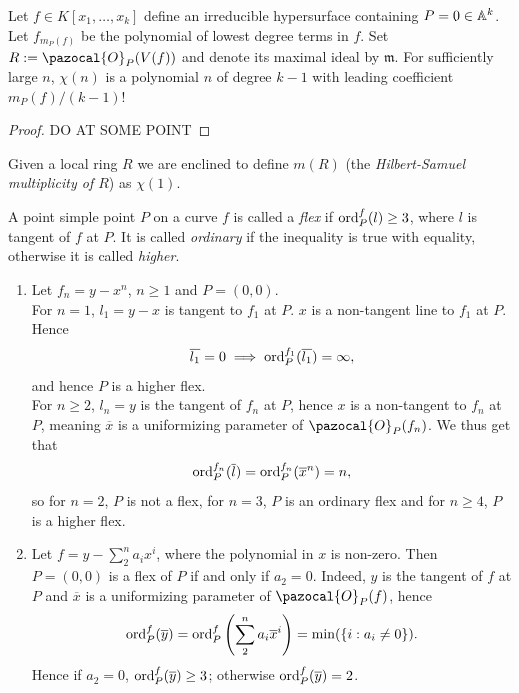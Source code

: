     \begin{proposition}
        Let $f\in K[x_1,\dots,x_k]$ define an irreducible hypersurface containing $P=0\in \mathbb{A}^k$. Let $f_{m_P(f)}$ be the polynomial of lowest degree terms in $f$. Set $R:= \pazocal{O}_P(V(f))$ and denote its maximal ideal by $\mathfrak{m}$. For sufficiently large $n$, $\chi(n)$ is a polynomial $n$ of degree $k-1$ with leading coefficient $m_P(f)/(k-1)!$ 
    \end{proposition}
    \begin{proof}
        {\LARGE DO AT SOME POINT}
    \end{proof}
    \begin{remark}
        Given a local ring $R$ we are enclined to define $m(R)$ (the \textit{Hilbert-Samuel multiplicity of $R$}) as $\chi(1)$.
    \end{remark}
    \begin{definition}
        A point simple point $P$ on a curve $f$ is called a \textit{flex} if $\mathrm{ord}_P^f(l) \geq 3$, where $l$ is tangent of $f$ at $P$. It is called \textit{ordinary} if the inequality is true with equality, otherwise it is called \textit{higher}. 
    \end{definition}
    \begin{example}
        \begin{enumerate}
            \item Let $f_n = y-x^n$, $n\geq1$ and $P=(0,0)$.\\ 
            For $n=1$, $l_1=y-x$ is tangent to $f_1$ at $P$. $x$ is a non-tangent line to $f_1$ at $P$. Hence
            $$\overline{l_1} = 0 \implies \mathrm{ord}_P^{f_1}(\overline{l_1}) = \infty,$$
            and hence $P$ is a higher flex. \\
            For $n\geq 2$, $l_n=y$ is the tangent of $f_n$ at $P$, hence $x$ is a non-tangent to $f_n$ at $P$, meaning $\overline{x}$ is a uniformizing parameter of $\pazocal{O}_P(f_n)$. We thus get that 
            $$\mathrm{ord}_P^{f_n}(\overline{l})=\mathrm{ord}_P^{f_n}(\overline{x}^n)=n,$$
            so for $n=2$, $P$ is not a flex, for $n=3$, $P$ is an ordinary flex and for $n\geq 4$, $P$ is a higher flex. 
            \item Let $f = y - \sum_2^n a_i x^i$, where the polynomial in $x$ is non-zero. Then $P=(0,0)$ is a flex of $P$ if and only if $a_2=0$. Indeed, $y$ is the tangent of $f$ at $P$ and $\overline{x}$ is a uniformizing parameter of $\pazocal{O}_P(f)$, hence
            $$\mathrm{ord}_P^f(\overline{y}) =\mathrm{ord}_P^f \left( \sum_2^n a_i \overline{x}^i\right) = \min(\{ i : a_i\neq 0\}).$$
            Hence if $a_2=0$, $\mathrm{ord}_P^f(\overline{y})\geq 3$; otherwise $\mathrm{ord}_P^f(\overline{y})=2$.
        \end{enumerate}         
    \end{example}
